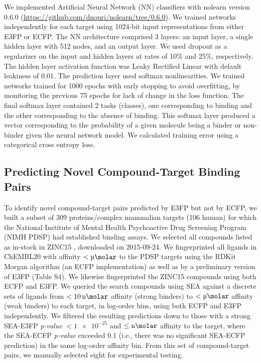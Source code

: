 \documentclass[../main.tex]{subfiles}
\begin{document}
\begin{refsection}
We implemented Artificial Neural Network (NN) classifiers with nolearn version 0.6.0 (\url{https://github.com/dnouri/nolearn/tree/0.6.0}).
We trained networks independently for each target using 1024-bit input representations from either E3FP or ECFP.
The NN architecture comprised 3 layers: an input layer, a single hidden layer with 512 nodes, and an output layer.
We used dropout \cite{srivastava_2014} as a regularizer on the input and hidden layers at rates of 10\% and 25\%, respectively.
The hidden layer activation function was Leaky Rectified Linear \cite{maas_2013} with default leakiness of 0.01.
The prediction layer used softmax nonlinearities.
We trained networks trained for 1000 epochs with early stopping to avoid overfitting, by monitoring the previous 75 epochs for lack of change in the loss function.
The final softmax layer contained 2 tasks (classes), one corresponding to binding and the other corresponding to the absence of binding.
This softmax layer produced a vector corresponding to the probability of a given molecule being a binder or non-binder given the neural network model.
We calculated training error using a categorical cross entropy loss.

\subsection*{Predicting Novel Compound-Target Binding Pairs}

To identify novel compound-target pairs predicted by E3FP but not by ECFP, we built a subset of 309 proteins/complex mammalian targets (106 human) for which the National Institute of Mental Health Psychoactive Drug Screening Program (NIMH PDSP) \cite{besnard_2012} had established binding assays.
We selected all compounds listed as in-stock in ZINC15  \cite{sterling_2015}, downloaded on 2015-09-24.
We fingerprinted all ligands in ChEMBL20 \cite{hersey_2015} with affinity $< \SI{}{\micro\molar}$ to the PDSP targets using the RDKit Morgan algorithm (an ECFP implementation) as well as by a preliminary version of E3FP (Table S4).
We likewise fingerprinted the ZINC15 compounds using both ECFP and E3FP.
We queried the search compounds using SEA against a discrete sets of ligands from $< \SI{10}{\nano\molar}$ affinity (strong binders) to   $< \SI{}{\micro\molar}$ affinity (weak binders) to each target, in log-order bins, using both ECFP and E3FP independently.
We filtered the resulting predictions down to those with a strong SEA-E3FP \emph{p-value} $< \num{1e-25}$ and $\le \SI{}{\nano\molar}$ affinity to the target, where the SEA-ECFP \emph{p-value} exceeded 0.1 (i.e., there was no significant SEA-ECFP prediction) in the same log-order affinity bin.
From this set of compound-target pairs, we manually selected eight for experimental testing.


\end{refsection}
\end{document}
